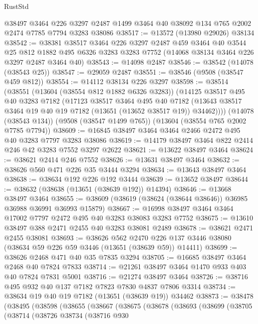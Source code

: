 \begin{lexlean}{RustStd}
\begin{coremodule}
    @38497
    @3464
    @226
    @3297
    @2487
    @1499
    @3464
    @40
    @38092
    @134
    @765
    @2002
    @2474
    @7785
    @7794
    @3283
    @38086
@38517 := @13572 (@13980 @29026) @38134
@38542 := @38381
    @38517
    @3464
    @226
    @3297
    @2487
    @459
    @3464
    @40
    @3544
    @25
    @812
    @1882
    @495
    @6326
    @3283
    @3283
    @7752
    (@14068 @38134 @3464 @226 @3297 @2487 @3464 @40)
@38543 := @14098 @2487
@38546 := @38542 (@14078 (@38543 @25))
@38547 := @29059 @2487
@38551 := @38546 (@9508 (@38547 @459 @812))
@38554 := @14112 @38134 @226 @3297
@38598 := @38514
    (@38551
      (@13604 (@38554 @812 @1882 @6326 @3283))
      (@14125
        @38517
        @495
        @40
        @3283
        @7182
        (@17123
          @38517
          @3464
          @495
          @40
          @7182
          (@13643 @38517 @3464 @19 @40 @19 @7182 (@13651 (@13652 @38517 @19)) @34462))))
    (@14078 (@38543 @134))
    (@9508 (@38547 @1499 @765))
    (@13604 (@38554 @765 @2002 @7785 @7794))
@38609 := @16845 @38497 @3464 @3464 @2466 @2472 @495 @40 @3283 @7797 @3283 @38086
@38619 := @14179 @38497 @3464 @822 @2414 @246 @42 @3283 @7552 @3297 @2622
@38621 := @13622 @38497 @3464
@38624 := @38621 @2414 @246 @7552
@38626 := @13631 @38497 @3464
@38632 := @38626 @560 @471 @226 @35 @3444 @3294
@38634 := @13643 @38497 @3464
@38638 := @38634 @192 @226 @192 @3444
@38639 := @13652 @38497
@38644 := @38632 (@38638 (@13651 (@38639 @192)) @14394)
@38646 := @13668 @38497 @3464
@38655 := @38609 (@38619 (@38624 (@38644 @38646)) @36985 @36988 @36991 @36993 @15879)
@38667 := @16998 @38497 @3464 @3464 @17002 @7797 @2472 @495 @40 @3283 @38083 @3283 @7752
@38675 := @13610 @38497 @388 @2471 @2455 @40 @3283 @38081 @2489
@38678 := @38621 @2471 @2455 @38081
@38693 := @38626
    @562
    @2470
    @226
    @137
    @3446
    @38080
    (@38634 @59 @226 @59 @3446 (@13651 (@38639 @59)) @14411)
@38699 := @38626 @2468 @471 @40 @35 @7835 @3294
@38705 := @16685 @38497 @3464 @2468 @40 @7824 @7833
@38714 := @21261 @38497 @3464 @1470 @933 @403 @40 @7824 @7831 @5001
@38716 := @21274 @38497 @3464
@38726 := @38716 @495 @932 @40 @137 @7182 @7823 @7830 @4837 @7806 @3314
@38734 := @38634 @19 @40 @19 @7182 (@13651 (@38639 @19)) @34462
@38873 := @38478
    (@38495
      (@38598
        (@38655
          (@38667
            (@38675
              (@38678
                (@38693
                  (@38699
                    (@38705
                      (@38714
                        (@38726
                          @38734
                          (@38716
                            @930

\end{coremodule}
\end{lexlean}

